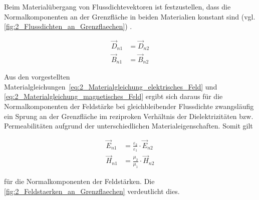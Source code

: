 Beim Materialübergang von Flussdichtevektoren ist festzustellen, dass die Normalkomponenten an der Grenzfläche in beiden Materialien konstant sind (vgl. \Abb \ref{fig:2_Flussdichten_an_Grenzflaechen}) \cite{EM_Schirmung}.  

\begin{subequations}
\begin{align}
    \vec D_{n1} &= \vec D_{n2} \label{subeq:2_Flussdichtennormale1} \\
    \vec B_{n1} &= \vec B_{n2} \label{subeq:2_Flussdichtennormale2}
\end{align}
\label{eq:2_Flussdichtennormale}
\end{subequations}


Aus den vorgestellten Materialgleichungen~\ref{eq:2_Materialgleichung_elektrisches_Feld} und \ref{eq:2_Materialgleichung_magnetisches_Feld} ergibt sich daraus für die Normalkomponenten der Feldstärke bei gleichbleibender Flussdichte zwangsläufig ein Sprung an der Grenzfläche im reziproken Verhältnis der Dielektrizitäten bzw. Permeabilitäten aufgrund der unterschiedlichen Materialeigenschaften. Somit gilt

\begin{subequations}
\begin{align}
    \vec E_{n1} &= \frac{\varepsilon_2}{\varepsilon_1} \cdot \vec E_{n2} \label{subeq:2_Feldstaerkenormale1} \\
    \vec H_{n1} &= \frac{\mu_2}{\mu_1} \cdot \vec H_{n2} \label{subeq:2_Feldstaerkenormale2}
\end{align}
\label{eq:2_Feldstaerkenormale}
\end{subequations}

für die Normalkomponenten der Feldstärken. Die \Abb \ref{fig:2_Feldstaerken_an_Grenzflaechen} verdeutlicht dies. 

